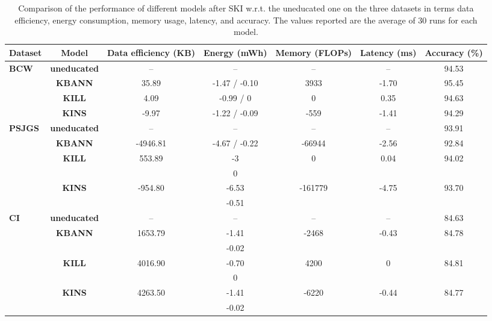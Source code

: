 \begin{table}
    \centering
    \begin{adjustbox}{width=\linewidth,center}
        \begin{tabular}{l|c|c|c|c|c|c}
            \toprule
            \textbf{Dataset} & \textbf{Model} & \textbf{Data efficiency (KB)} & \textbf{Energy (mWh)} & \textbf{Memory (FLOPs)} & \textbf{Latency (ms)} & \textbf{Accuracy (\%)}\\

            \midrule
            \multirow{4}{*}{\textbf{BCW}} & \textbf{uneducated} & -- & -- & -- & -- & 94.53\\
            \cmidrule{2-8}
            & {\textbf{KBANN}} & {35.89} & -1.47 / -0.10 & {3933} & {-1.70} & {95.45}\\
            \cline{2-8}
            & {\textbf{KILL}} &  {4.09} & -0.99 / 0 & {0} & {0.35} & {94.63}\\
            \cline{2-8}
            & {\textbf{KINS}} &  {-9.97} & -1.22 / -0.09 & {-559} & {-1.41} & {94.29}\\
            \midrule

            \multirow{4}{*}{\textbf{PSJGS}} & \textbf{uneducated} & -- & -- & -- & -- & 93.91\\
            \cline{2-8}
            & {\textbf{KBANN}} & {-4946.81} & -4.67 / -0.22 & {-66944} & {-2.56} & {92.84}\\
            \cline{2-8}
            & {\textbf{KILL}} &  {553.89} & -3 & {0} & {0.04} & {94.02}\\
            & & & 0 & & & \\
            \cline{2-8}
            & {\textbf{KINS}} &  {-954.80} & -6.53 & {-161779} & {-4.75} & {93.70}\\
            & & & -0.51 & & & \\
            \midrule

            \multirow{4}{*}{\textbf{CI}} & \textbf{uneducated} & -- & -- & -- & -- & 84.63\\
            \cline{2-8}
            & {\textbf{KBANN}} & {1653.79} & -1.41 & {-2468} & {-0.43} & {84.78}\\
            & & & -0.02 & & & \\
            \cline{2-8}
            & {\textbf{KILL}} & {4016.90} & -0.70 & {4200} & {0} & {84.81}\\
            & & & 0 & & & \\
            \cline{2-8}
            & {\textbf{KINS}} & {4263.50} & -1.41 & {-6220} & {-0.44} & {84.77}\\
            & & & -0.02 & & & \\
            \bottomrule
        \end{tabular}
    \end{adjustbox}
    \caption[QoS results for different \gls{SKI} methods]{
        Comparison of the performance of different models after \gls{SKI} w.r.t. the uneducated one on the three datasets in terms data efficiency, energy consumption, memory usage, latency, and accuracy.
        The values reported are the average of 30 runs for each model.
    }
    \label{tab:qos-results}
\end{table}
